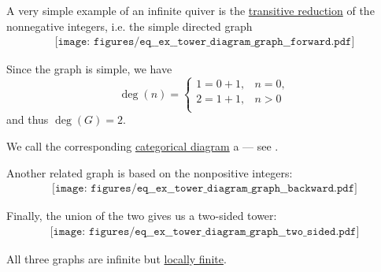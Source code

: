 \begin{example}\label{ex:tower_diagram_graph}
  A very simple example of an infinite quiver is the \hyperref[def:relation_closures/transitive]{transitive reduction} of the nonnegative integers, i.e. the simple directed graph
  \begin{equation}\label{eq:ex:tower_diagram_graph/forward}
    \begin{aligned}
      \texttt{[image: figures/eq\_\_ex\_\_tower\_diagram\_graph\_\_forward.pdf]}
    \end{aligned}
  \end{equation}

  Since the graph is simple, we have
  \begin{equation*}
    \deg(n) = \begin{cases}
      1 = 0 + 1, &n = 0, \\
      2 = 1 + 1, &n > 0 \\
    \end{cases}
  \end{equation*}
  and thus \( \deg(G) = 2 \).

  We call the corresponding \hyperref[def:categorical_diagram]{categorical diagram} a  --- see .

  Another related graph is based on the nonpositive integers:
  \begin{equation}\label{eq:ex:tower_diagram_graph/backward}
    \begin{aligned}
      \texttt{[image: figures/eq\_\_ex\_\_tower\_diagram\_graph\_\_backward.pdf]}
    \end{aligned}
  \end{equation}

  Finally, the union of the two gives us a two-sided tower:
  \begin{equation}\label{eq:ex:tower_diagram_graph/two_sided}
    \begin{aligned}
      \texttt{[image: figures/eq\_\_ex\_\_tower\_diagram\_graph\_\_two\_sided.pdf]}
    \end{aligned}
  \end{equation}

  All three graphs are infinite but \hyperref[def:hypergraph/degree]{locally finite}.
\end{example}

